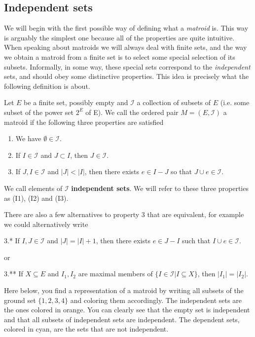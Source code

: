 \subsection{Independent sets}

We will begin with the first possible way of defining what a \textit{matroid} is. This way is arguably the simplest one because all of the properties are quite intuitive. When speaking about matroids we will always deal with finite sets, and the way we obtain a matroid from a finite set is to select some special selection of its subsets. Informally, in some way, these special sets correspond to the \textit{independent} sets, and should obey some distinctive properties. This idea is precisely what the following definition is about.

\begin{defn}
    Let $E$ be a finite set, possibly empty and $\mathcal{I}$ a collection of subsets of $E$ (i.e. some subset of the power set $2^E$ of E). We call the ordered pair $M = (E, \mathcal{I})$ a matroid if the following three properties are satisfied

    \begin{enumerate}
        \item We have $\emptyset \in \mathcal{I}$.
        
        \item If $I \in \mathcal{I}$ and $J \subset I$, then $J \in \mathcal{I}$.
        
        \item If $J, I \in \mathcal{I}$ and $|J| < |I|$, then there exists $e \in I - J$ so that $J \cup e \in \mathcal{I}$.
    \end{enumerate}

    We call elements of $\mathcal{I}$ \textbf{independent sets}. We will refer to these three properties as (I1), (I2) and (I3).
\end{defn}

There are also a few alternatives to property 3 that are equivalent, for example we could alternatively write

3.* If $I, J \in \mathcal{I} $ and $|J| = |I| + 1$, then there exists $e \in J - I$ such that $I \cup e \in \mathcal{I}$.

or

3.** If $X \subseteq E$ and $I_1, I_2$ are maximal members of $\{ I \in \mathcal{I} | I \subseteq X \}$, then $|I_1| = |I_2|$.

Here below, you find a representation of a matroid by writing all subsets of the ground set $\{1,2,3,4\}$ and coloring them accordingly. The independent sets are the ones colored in orange. You can clearly see that the empty set is independent and that all subsets of independent sets are independent. The dependent sets, colored in cyan, are the sets that are not independent.

